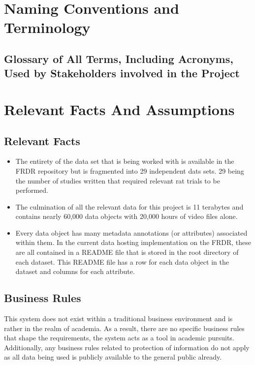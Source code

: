 \documentclass[12pt]{article}
\begin{document}
\section{Naming Conventions and Terminology}
\subsection{Glossary of All Terms, Including Acronyms, Used by Stakeholders
involved in the Project}

\printnoidxglossary[type=SWE, title={Software Engineering Terms}]
\printnoidxglossary[type=domain, title={Domain-Specific Research Terms}]
\printnoidxglossary[type=general, title={General Terms}]



\section{Relevant Facts And Assumptions}
\subsection{Relevant Facts}

\begin{itemize}
    \item The entirety of the data set that is being worked with is available in the FRDR repository
    but is fragmented into 29 independent dats sets. 29 being the number of studies written that required relevant
    rat trials to be performed.
    \item The culmination of all the relevant data for this project is 11 terabytes and contains nearly 60,000 data objects with
    20,000 hours of video files alone.
    \item Every data object has many metadata annotations (or attributes) associated within them. In the current data hosting
    implementation on the FRDR, these are all contained in a README file that is stored in the root directory of each dataset.
    This README file has a row for each data object in the dataset and columns for each attribute.
\end{itemize}

\subsection{Business Rules}

    \par{This system does not exist within a traditional business environment and is
    rather in the realm of academia. As a result, there are no specific business rules that shape
    the requirements, the system acts as a tool in academic pursuits. Additionally, any business rules
    related to protection of information do not apply as all data being used is publicly available to
    the general public already. }
\end{document}
